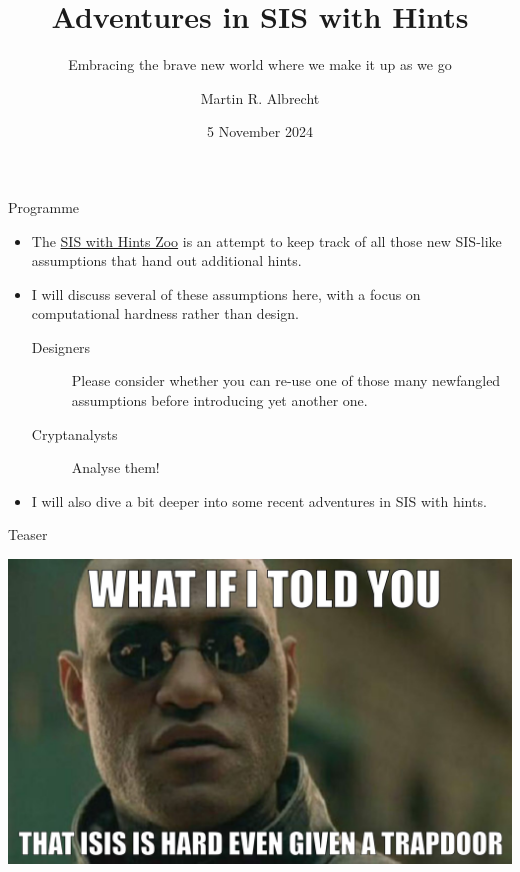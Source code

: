 \documentclass[xcolor=table,10pt,aspectratio=169]{beamer}
\author{Martin R. Albrecht}
\date{5 November 2024}
\title{Adventures in SIS with Hints}
\subtitle{Embracing the brave new world where we make it up as we go}
\begin{document}
\maketitle

\begin{frame}[label={sec:org4801502}]{Programme}
\begin{itemize}
\item The \href{https://malb.io/sis-with-hints.html}{SIS with Hints Zoo} is an attempt to keep track of all those new SIS-like assumptions that hand out additional hints.

\item I will discuss several of these assumptions here, with a focus on computational hardness rather than design.

\begin{description}
\item[{Designers}] Please consider whether you can re-use one of those many newfangled assumptions before introducing yet another one.

\item[{Cryptanalysts}] Analyse them!
\end{description}

\item I will also dive a bit deeper into some recent adventures in SIS with hints.
\end{itemize}
\end{frame}

\begin{frame}[label={sec:orgc0cf1fc}]{Teaser}
\begin{center}
\includegraphics[keepaspectratio,height=.9\textheight]{./sis-with-hints-teaser.jpg}
\end{center}
\end{frame}
\end{document}

